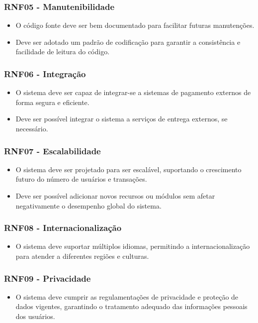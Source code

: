 \subsubsection*{RNF05 - Manutenibilidade}
\begin{itemize}
    \item O código fonte deve ser bem documentado para facilitar futuras manutenções.
    \item Deve ser adotado um padrão de codificação para garantir a consistência e facilidade de leitura do código.
\end{itemize}

\subsubsection*{RNF06 - Integração}
\begin{itemize}
    \item O sistema deve ser capaz de integrar-se a sistemas de pagamento externos de forma segura e eficiente.
    \item Deve ser possível integrar o sistema a serviços de entrega externos, se necessário.
\end{itemize}

\subsubsection*{RNF07 - Escalabilidade}
\begin{itemize}
    \item O sistema deve ser projetado para ser escalável, suportando o crescimento futuro do número de usuários e transações.
    \item Deve ser possível adicionar novos recursos ou módulos sem afetar negativamente o desempenho global do sistema.
\end{itemize}

\subsubsection*{RNF08 - Internacionalização}
\begin{itemize}
    \item O sistema deve suportar múltiplos idiomas, permitindo a internacionalização para atender a diferentes regiões e culturas.
\end{itemize}

\subsubsection*{RNF09 - Privacidade}
\begin{itemize}
    \item O sistema deve cumprir as regulamentações de privacidade e proteção de dados vigentes, garantindo o tratamento adequado das informações pessoais dos usuários.
\end{itemize}

